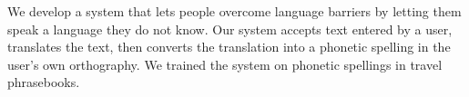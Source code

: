 We develop a system that lets people overcome language barriers by letting them speak a language they do not know.  Our system accepts text entered by a user, translates the text, then converts the translation into a phonetic spelling in the user's own orthography.  We trained the system on phonetic spellings in travel phrasebooks.
